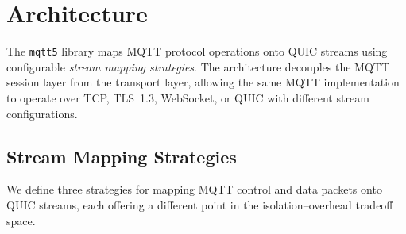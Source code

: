\documentclass[a4paper,fleqn]{cas-dc}
\begin{document}

\section{Architecture}
\label{sec:architecture}

The \texttt{mqtt5} library maps MQTT protocol operations onto QUIC streams using configurable \emph{stream mapping strategies}. The architecture decouples the MQTT session layer from the transport layer, allowing the same MQTT implementation to operate over TCP, TLS~1.3, WebSocket, or QUIC with different stream configurations.

\subsection{Stream Mapping Strategies}

We define three strategies for mapping MQTT control and data packets onto QUIC streams, each offering a different point in the isolation--overhead tradeoff space.
\end{document}
